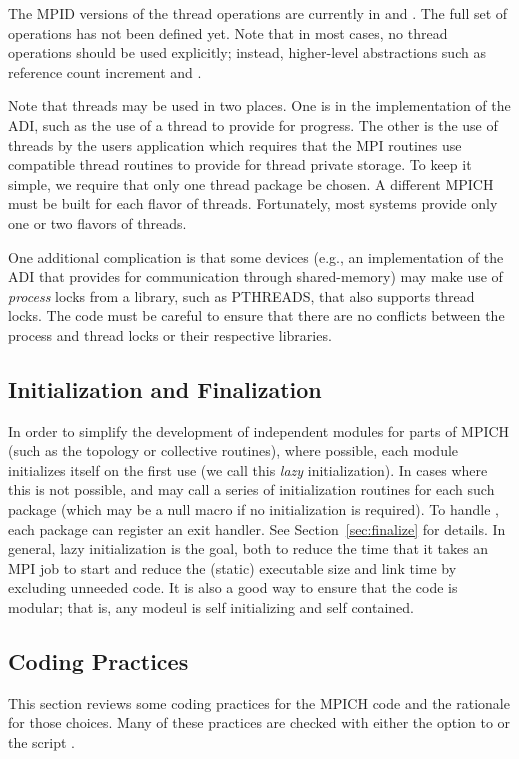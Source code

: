 \documentclass{article}
\begin{document}
The MPID versions of the thread operations are currently in 
 and
.  The full set of operations has not
been defined yet.  Note that in most cases, no thread
operations should be used explicitly; instead, higher-level
abstractions such as reference count increment and
. 

Note that threads may be used in two places.  One is in the
implementation of the ADI, such as the use of a thread to provide for
progress.  The other is the use of threads by the users application
which requires that the MPI routines use compatible thread routines to
provide for thread private storage.  To keep it simple, we require
that only one thread package be chosen.  A different MPICH must be
built for each flavor of threads.  Fortunately, most systems provide
only one or two flavors of threads.

One additional complication is that some devices (e.g., an
implementation of the ADI that provides for communication through
shared-memory) may make use of \emph{process} locks from a library,
such as PTHREADS, that also supports thread locks.  The code must be
careful to ensure that there are no conflicts between the process and
thread locks or their respective libraries.

\subsection{Initialization and Finalization}
\label{sec:initialization}
In order to simplify the development of independent modules for parts
of MPICH (such as the topology or collective routines),  where
possible, each module initializes itself on the first use (we call
this \emph{lazy} initialization).  In cases
where this is not possible, 
 and  may call a series of
initialization routines for each such package (which may be a null
macro if no initialization is required).  To handle
, each package can register an exit handler.  See
Section~\ref{sec:finalize} for details.
In general, lazy initialization is the goal, both to reduce the time
that it takes an MPI job to start and reduce the (static) executable
size and link time by excluding unneeded code.  It is also a good way
to ensure that the code is modular; that is, any modeul is self
initializing and self contained.

\subsection{Coding Practices}
\label{sec:coding-practices}
This section reviews some coding practices for the MPICH code and the
rationale for those choices.  Many of these practices are checked with
either the  option to  or the
script .
\end{document}
